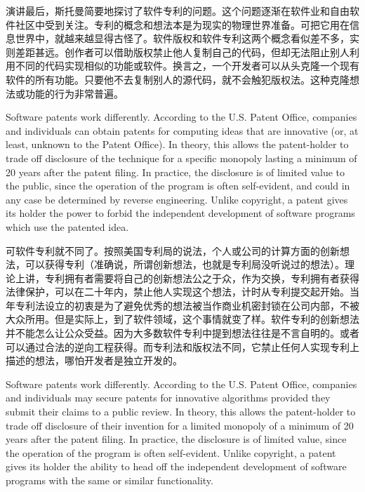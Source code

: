 \ifdefined\chs
演讲最后，斯托曼简要地探讨了软件专利的问题。这个问题逐渐在软件业和自由软件社区中受到关注。专利的概念和想法本是为现实的物理世界准备。可把它用在信息世界中，就越来越显得古怪了。软件版权和软件专利这两个概念看似差不多，实则差距甚远。创作者可以借助版权禁止他人复制自己的代码，但却无法阻止别人利用不同的代码实现相似的功能或软件。换言之，一个开发者可以从头克隆一个现有软件的所有功能。只要他不去复制别人的源代码，就不会触犯版权法。这种克隆想法或功能的行为非常普遍。
\fi
\fi

\ifdefined\vtwo
\ifdefined\eng
Software patents work differently. According to the U.S. Patent Office, companies and individuals can obtain patents for computing ideas that are innovative (or, at least, unknown to the Patent Office). In theory, this allows the patent-holder to trade off disclosure of the technique for a specific monopoly lasting a minimum of 20 years after the patent filing. In practice, the disclosure is of limited value to the public, since the operation of the program is often self-evident, and could in any case be determined by reverse engineering. Unlike copyright, a patent gives its holder the power to forbid the independent development of software programs which use the patented idea.
\fi

\ifdefined\chs
可软件专利就不同了。按照美国专利局的说法，个人或公司的计算方面的创新想法，可以获得专利（准确说，所谓创新想法，也就是专利局没听说过的想法）。理论上讲，专利拥有者需要将自己的创新想法公之于众，作为交换，专利拥有者获得法律保护，可以在二十年内，禁止他人实现这个想法，计时从专利提交起开始。当年专利法设立的初衷是为了避免优秀的想法被当作商业机密封锁在公司内部，不被大众所用。但是实际上，到了软件领域，这个事情就变了样。软件专利的创新想法并不能怎么让公众受益。因为大多数软件专利中提到想法往往是不言自明的。或者可以通过合法的逆向工程获得。而专利法和版权法不同，它禁止任何人实现专利上描述的想法，哪怕开发者是独立开发的。
\fi
\fi

\ifdefined\vone
\ifdefined\eng
Software patents work differently. According to the U.S. Patent Office, companies and individuals may secure patents for innovative algorithms provided they submit their claims to a public review. In theory, this allows the patent-holder to trade off disclosure of their invention for a limited monopoly of a minimum of 20 years after the patent filing. In practice, the disclosure is of limited value, since the operation of the program is often self-evident. Unlike copyright, a patent gives its holder the ability to head off the independent development of software programs with the same or similar functionality.
\fi

